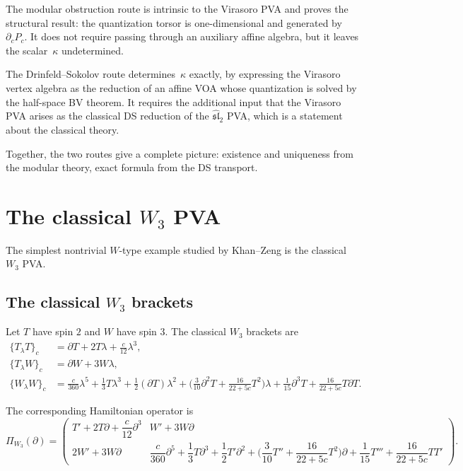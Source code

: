 \begin{remark}
\label{rem:virasoro-two-routes}
The modular obstruction route is intrinsic to the Virasoro PVA and proves
the structural result: the quantization torsor is one-dimensional and
generated by $\partial_c P_c$. It does not require passing through an
auxiliary affine algebra, but it leaves the scalar~$\kappa$ undetermined.

The Drinfeld--Sokolov route determines~$\kappa$ exactly, by expressing
the Virasoro vertex algebra as the reduction of an affine VOA whose
quantization is solved by the half-space BV theorem. It requires the
additional input that the Virasoro PVA arises as the classical DS
reduction of the $\widehat{\mathfrak{sl}}_2$ PVA, which is a statement
about the classical theory.

Together, the two routes give a complete picture: existence and uniqueness
from the modular theory, exact formula from the DS transport.
\end{remark}

\section{The classical $W_3$ PVA}

The simplest nontrivial $W$-type example studied by Khan--Zeng is
the classical $W_3$ PVA.

\subsection{The classical $W_3$ brackets}

Let $T$ have spin $2$ and $W$ have spin $3$. The classical $W_3$ brackets are
\cite{KZ25}
\begin{align}
\{T_\lambda T\}_c
&=
\partial T+2T\lambda+\frac{c}{12}\lambda^3,
\\[4pt]
\{T_\lambda W\}_c
&=
\partial W+3W\lambda,
\\[4pt]
\{W_\lambda W\}_c
&=
\frac{c}{360}\lambda^5
+\frac13 T\lambda^3
+\frac12(\partial T)\lambda^2
+\Big(\frac3{10}\partial^2T+\frac{16}{22+5c}T^2\Big)\lambda
+\frac1{15}\partial^3T
+\frac{16}{22+5c}T\partial T.
\end{align}

The corresponding Hamiltonian operator is
\[
\Pi_{W_3}(\partial)=
\begin{pmatrix}
T'+2T\partial+\dfrac c{12}\partial^3
&
W'+3W\partial
\\[2mm]
2W'+3W\partial
&
\dfrac c{360}\partial^5
+\dfrac13 T\partial^3
+\dfrac12 T'\partial^2
+\Big(\dfrac{3}{10}T''+\dfrac{16}{22+5c}T^2\Big)\partial
+\dfrac1{15}T'''
+\dfrac{16}{22+5c}TT'
\end{pmatrix}.
\]

